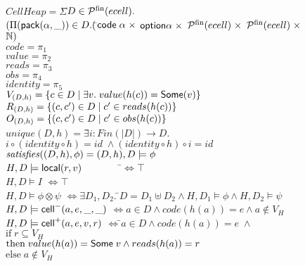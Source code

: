 \begin{figure}
\mbox{}
\begin{tabbing}
$CellHeap = \Sigma$\=$ D \in \mathcal{P}^{\mathrm{fin}}(ecell).$ \\
               \>$(\Pi (\mathsf{pack}({\alpha}, {\_})) \in D. ($\=${\mathsf{code}\;{\alpha}} \;\times$
                                         ${\mathsf{option }{\alpha}} \;\times$ 
                                         ${\mathcal{P}^{\mathrm{fin}}(ecell)} \;\times$ 
                                         ${\mathcal{P}^{\mathrm{fin}}(ecell)} \;\times$ 
                                         $\mathbb{N})$ \\[1em]
       

$code = \pi_1$ \\
$value = \pi_2$ \\
$reads = \pi_3$ \\
$obs = \pi_4$ \\
$identity = \pi_5$ \\[1em]

$V_{(D, h)} = \{{{c \in D}\;|\;{\exists v.\; value(h(c)) = \mathsf{Some}(v)}}\}$ \\
$R_{(D, h)} = \{{{(c,c') \in D}\;|\;{ c' \in reads(h(c)) }}\}$ \\
$O_{(D, h)} = \{{{(c,c') \in D}\;|\;{ c' \in obs(h(c)) }}\}$ \\[1em]

$unique(D,h) = \exists$\=$i : Fin(|D|) \to D.$\\
                       \>$i \circ (identity \circ h) = id \; \land (identity \circ h) \circ i = id$ \\[1em]

$\mathit{satisfies}({(D,h)}, {\phi}) = (D,h), D \models \phi$ \\[1em]

$H, D \models \mathsf{local}({r}, {v}) \qquad \qquad$\=$\iff \top$ \\
$H, D \models I$                            \>$\iff \top$ \\
$H, D \models \phi \otimes \psi$            \>$\iff \exists D_1, D_2.\;$\=$D = D_1 \uplus D_2 
                                                      \land H, D_1 \models \phi
                                                      \land H, D_2 \models \psi$ \\
$H, D \models \mathsf{cell}^{-}({a}, {e}, {\_}, {\_})$               \>$\iff a \in D \land code(h(a)) = e \land a \not \in V_H$ \\
$H, D \models \mathsf{cell}^{+}({a}, {e}, {v}, {r})$         \>$\iff $\=$ a \in D \land code(h(a)) = e \;\land$ \\
\>      \>$\mathrm{if}\;r \subseteq V_H$ \\
\>      \>$\mathrm{then}\;value(h(a)) = \mathsf{Some}\;v \land reads(h(a)) = r$ \\
\>      \>$\mathrm{else}\;a \not\in V_H$\\[1em]
 


\end{tabbing}
\end{figure}
